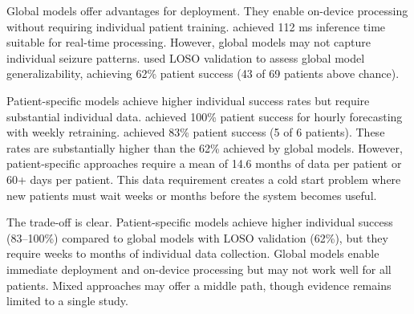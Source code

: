 Global models offer advantages for deployment. They enable on-device processing without requiring individual patient training. \textcite{spahrDeepLearningbasedDetection2025} achieved 112 ms inference time suitable for real-time processing. However, global models may not capture individual seizure patterns. \textcite{meiselMachineLearningWristband2020} used LOSO validation to assess global model generalizability, achieving 62\% patient success (43 of 69 patients above chance).

Patient-specific models achieve higher individual success rates but require substantial individual data. \textcite{stirlingForecastingSeizureLikelihood2021} achieved 100\% patient success for hourly forecasting with weekly retraining. \textcite{nasseriAmbulatorySeizureForecasting2021} achieved 83\% patient success (5 of 6 patients). These rates are substantially higher than the 62\% achieved by global models. However, patient-specific approaches require a mean of 14.6 months of data per patient or 60+ days per patient. This data requirement creates a cold start problem where new patients must wait weeks or months before the system becomes useful.

The trade-off is clear. Patient-specific models achieve higher individual success (83--100\%) compared to global models with LOSO validation (62\%), but they require weeks to months of individual data collection. Global models enable immediate deployment and on-device processing but may not work well for all patients. Mixed approaches may offer a middle path, though evidence remains limited to a single study.
